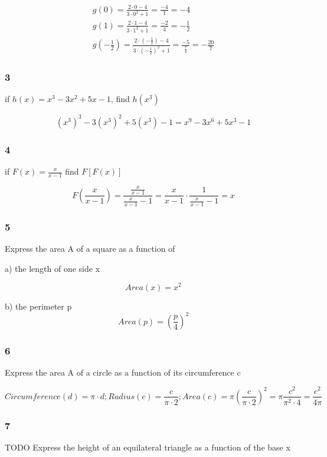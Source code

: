 \documentclass[]{report}
\begin{document}
\begin{align*}
g(0) = \frac{2\cdot0-4}{3\cdot0^2 + 1} = \frac{-4}{1} = -4\\
g(1) = \frac{2\cdot1 - 4}{3\cdot1^2 + 1} = \frac{-2}{4} = -\frac{1}{2}\\
g(-\frac{1}{2}) = \frac{2\cdot(-\frac{1}{2}) - 4}{3\cdot(-\frac{1}{2})^2 + 1} = \frac{-5}{\frac{7}{4}} = -\frac{20}{7}
\end{align*}


\subsubsection{3}
if $h(x) = x^3 - 3x^2 + 5x - 1$, find $h(x^3)$

\[
(x^3)^3 - 3(x^3)^2 + 5(x^3) - 1 = x^9 - 3x^6 + 5x^3 - 1
\]

\subsubsection{4}

if $F(x) = \frac{x}{x-1}$ find $F[F(x)]$


\[
F(\frac{x}{x-1}) = \frac{\frac{x}{x-1}}{\frac{x}{x-1}-1} = \frac{x}{x-1} \cdot \frac{1}{\frac{x}{x-1}-1} =  x
\]

\subsubsection{5}

Express the area A of a square as a function of 

a) the length of one side x

\[
Area(x) = x^2
\]

b) the perimeter p
\[
Area(p) = (\frac{p}{4})^2
\]

\subsubsection{6}

Express the area A of a circle as a function of its circumference c

\[
Circumference(d) = \pi \cdot d;
Radius(c) = \frac{c}{\pi \cdot 2};
Area(c) = \pi (\frac{c}{\pi \cdot 2})^2 = \pi \frac{c^2}{\pi^2 \cdot 4} = \frac{c^2}{4\pi}
\]

\subsubsection{7} TODO
Express the height of an equilateral triangle as a function of the base x
\end{document}
